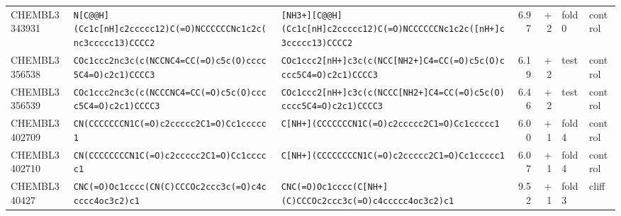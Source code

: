 \begin{longtable}{l p{4.4cm} p{4.4cm} r r l l}
CHEMBL3343931 & \texttt{N[C@@H]\allowbreak{}(\allowbreak{}Cc1c[nH]\allowbreak{}c2ccccc12)\allowbreak{}C(\allowbreak{}=\allowbreak{}O)\allowbreak{}NCCCCCCNc1c2c(\allowbreak{}nc3ccccc13)\allowbreak{}CCCC2} & \texttt{[NH3+]\allowbreak{}[C@@H]\allowbreak{}(\allowbreak{}Cc1c[nH]\allowbreak{}c2ccccc12)\allowbreak{}C(\allowbreak{}=\allowbreak{}O)\allowbreak{}NCCCCCCNc1c2c(\allowbreak{}[nH+]\allowbreak{}c3ccccc13)\allowbreak{}CCCC2} & 6.97 & +2 & fold 0 & control \\
CHEMBL3356538 & \texttt{COc1ccc2nc3c(\allowbreak{}c(\allowbreak{}NCCNC4=\allowbreak{}CC(\allowbreak{}=\allowbreak{}O)\allowbreak{}c5c(\allowbreak{}O)\allowbreak{}cccc5C4=\allowbreak{}O)\allowbreak{}c2c1)\allowbreak{}CCCC3} & \texttt{COc1ccc2[nH+]\allowbreak{}c3c(\allowbreak{}c(\allowbreak{}NCC[NH2+]\allowbreak{}C4=\allowbreak{}CC(\allowbreak{}=\allowbreak{}O)\allowbreak{}c5c(\allowbreak{}O)\allowbreak{}cccc5C4=\allowbreak{}O)\allowbreak{}c2c1)\allowbreak{}CCCC3} & 6.19 & +2 & test & control \\
CHEMBL3356539 & \texttt{COc1ccc2nc3c(\allowbreak{}c(\allowbreak{}NCCCNC4=\allowbreak{}CC(\allowbreak{}=\allowbreak{}O)\allowbreak{}c5c(\allowbreak{}O)\allowbreak{}cccc5C4=\allowbreak{}O)\allowbreak{}c2c1)\allowbreak{}CCCC3} & \texttt{COc1ccc2[nH+]\allowbreak{}c3c(\allowbreak{}c(\allowbreak{}NCCC[NH2+]\allowbreak{}C4=\allowbreak{}CC(\allowbreak{}=\allowbreak{}O)\allowbreak{}c5c(\allowbreak{}O)\allowbreak{}cccc5C4=\allowbreak{}O)\allowbreak{}c2c1)\allowbreak{}CCCC3} & 6.46 & +2 & test & control \\
CHEMBL3402709 & \texttt{CN(\allowbreak{}CCCCCCCN1C(\allowbreak{}=\allowbreak{}O)\allowbreak{}c2ccccc2C1=\allowbreak{}O)\allowbreak{}Cc1ccccc1} & \texttt{C[NH+]\allowbreak{}(\allowbreak{}CCCCCCCN1C(\allowbreak{}=\allowbreak{}O)\allowbreak{}c2ccccc2C1=\allowbreak{}O)\allowbreak{}Cc1ccccc1} & 6.00 & +1 & fold 4 & control \\
CHEMBL3402710 & \texttt{CN(\allowbreak{}CCCCCCCCN1C(\allowbreak{}=\allowbreak{}O)\allowbreak{}c2ccccc2C1=\allowbreak{}O)\allowbreak{}Cc1ccccc1} & \texttt{C[NH+]\allowbreak{}(\allowbreak{}CCCCCCCCN1C(\allowbreak{}=\allowbreak{}O)\allowbreak{}c2ccccc2C1=\allowbreak{}O)\allowbreak{}Cc1ccccc1} & 6.07 & +1 & fold 4 & control \\
CHEMBL340427 & \texttt{CNC(\allowbreak{}=\allowbreak{}O)\allowbreak{}Oc1cccc(\allowbreak{}CN(\allowbreak{}C)\allowbreak{}CCCOc2ccc3c(\allowbreak{}=\allowbreak{}O)\allowbreak{}c4ccccc4oc3c2)\allowbreak{}c1} & \texttt{CNC(\allowbreak{}=\allowbreak{}O)\allowbreak{}Oc1cccc(\allowbreak{}C[NH+]\allowbreak{}(\allowbreak{}C)\allowbreak{}CCCOc2ccc3c(\allowbreak{}=\allowbreak{}O)\allowbreak{}c4ccccc4oc3c2)\allowbreak{}c1} & 9.52 & +1 & fold 3 & cliff \\

\end{longtable}
